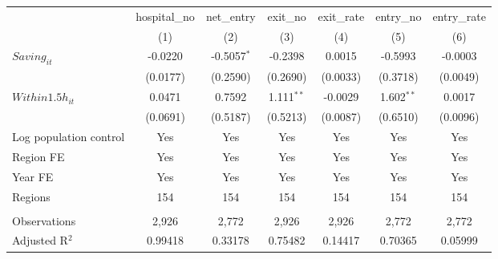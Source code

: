 \begingroup
\centering
\begin{tabular}{lcccccc}
   \toprule
                          & hospital\_no  & net\_entry    & exit\_no     & exit\_rate  & entry\_no    & entry\_rate \\    
                          & (1)           & (2)           & (3)          & (4)         & (5)          & (6)\\  
   \midrule 
   $Saving_{it}$          & -0.0220       & -0.5057$^{*}$ & -0.2398      & 0.0015      & -0.5993      & -0.0003\\   
                          & (0.0177)      & (0.2590)      & (0.2690)     & (0.0033)    & (0.3718)     & (0.0049)\\   
   $Within1.5h_{it}$      & 0.0471        & 0.7592        & 1.111$^{**}$ & -0.0029     & 1.602$^{**}$ & 0.0017\\   
                          & (0.0691)      & (0.5187)      & (0.5213)     & (0.0087)    & (0.6510)     & (0.0096)\\   
   Log population control & Yes           & Yes           & Yes          & Yes         & Yes          & Yes\\  
   Region FE              & Yes           & Yes           & Yes          & Yes         & Yes          & Yes\\  
   Year FE                & Yes           & Yes           & Yes          & Yes         & Yes          & Yes\\  
   Regions                & 154           & 154           & 154          & 154         & 154          & 154\\  
    \\
   Observations           & 2,926         & 2,772         & 2,926        & 2,926       & 2,772        & 2,772\\  
   Adjusted R$^2$         & 0.99418       & 0.33178       & 0.75482      & 0.14417     & 0.70365      & 0.05999\\  
   \bottomrule
\end{tabular}
\par\endgroup
